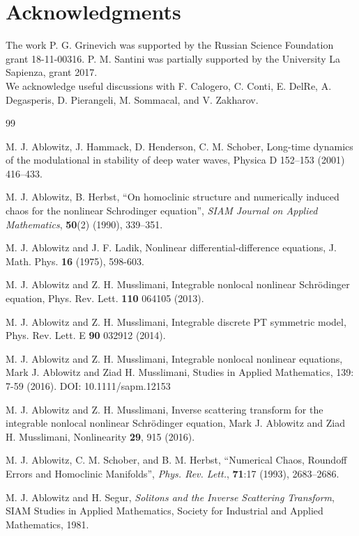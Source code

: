 \documentclass[12pt]{article}
\begin{document}
\section{Acknowledgments} The work P. G. Grinevich was supported by the Russian Science Foundation grant 18-11-00316. P. M. Santini was partially supported by the University La Sapienza, grant 2017.\\
We acknowledge useful discussions with F. Calogero, C. Conti, E. DelRe, A. Degasperis, D. Pierangeli, M. Sommacal, and V. Zakharov.

\begin{thebibliography}{99}


 M. J. Ablowitz, J. Hammack, D. Henderson, C. M. Schober, Long-time dynamics of the modulational in
stability of deep water waves, Physica D 152--153 (2001) 416--433.

 M. J. Ablowitz, B. Herbst, ``On homoclinic structure and numerically induced chaos for the nonlinear Schrodinger equation'', \textit{SIAM Journal on Applied Mathematics},  \textbf{50}(2) (1990), 339--351.

  M. J. Ablowitz and J. F. Ladik, Nonlinear differential-difference equations, J. Math. Phys. {\bf 16} (1975), 598-603.
  
 M. J. Ablowitz and Z. H. Musslimani, Integrable nonlocal nonlinear Schr\"odinger equation, Phys. Rev. Lett. {\bf 110} 064105 (2013).

 M. J. Ablowitz and Z. H. Musslimani, Integrable discrete PT symmetric model, Phys. Rev. Lett. E {\bf 90} 032912 (2014).

 M. J. Ablowitz and Z. H. Musslimani, Integrable nonlocal nonlinear equations, Mark J. Ablowitz and Ziad H. Musslimani, Studies in Applied Mathematics, 139: 7-59 (2016). DOI: 10.1111/sapm.12153

 M. J. Ablowitz and Z. H. Musslimani, Inverse scattering transform for the integrable nonlocal nonlinear Schr\"odinger equation, Mark J. Ablowitz and Ziad H. Musslimani, Nonlinearity {\bf 29}, 915 (2016).

 M. J. Ablowitz, C. M. Schober, and B. M. Herbst, ``Numerical Chaos, Roundoff Errors and Homoclinic Manifolds'', \textit{Phys. Rev. Lett.}, \textbf{71}:17 (1993), 2683--2686.

 M. J. Ablowitz and H. Segur, {\it Solitons and the Inverse Scattering Transform}, SIAM Studies in Applied Mathematics, Society for Industrial and Applied Mathematics, 1981.  


\end{thebibliography}
\end{document}
